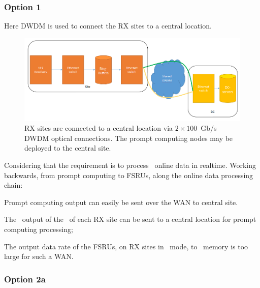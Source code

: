 \documentclass[12pt,a4paper]{article}
\begin{document}
\subsubsection{Option 1}
Here DWDM is used to connect the \ED RX sites to a central location.
\label{sssec:option1}
\begin{figure}[h]
\centering
\includegraphics[width=\textwidth]{photon_option_1.png}
\caption{\ED RX sites are connected to a central location via $2\times 100 $~Gb/s DWDM optical connections. The prompt computing nodes may be deployed to the central site. \label{fig:option_1}
}
\end{figure}
Considering that the requirement is to process \NBW\ online data in realtime.
Working backwards, from prompt computing to FSRUs, along the online data processing chain:
\bitm
\item Prompt computing output can easily be sent over the WAN to central site.
\item The \NBW\ output of the \SBF\ of each RX site can be sent to a central location for prompt computing processing;
\item The output data rate of the FSRUs, on RX sites in \NBW\ mode, to \RB\ memory is too large for such a WAN.
\eitm

\subsubsection{Option 2a}
\label{sssec:option2a}
\end{document}
